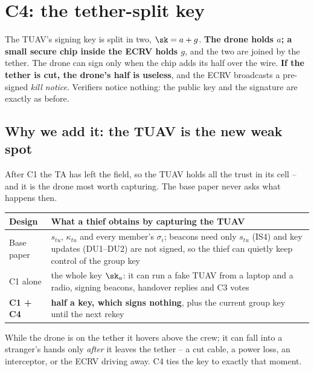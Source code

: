 \chapter{C4: the tether-split key}\label{ch:c4}
\begin{keybox}[colframe=tether,colback=tether!5]
The TUAV's signing key is split in two, $\sk=a+g$. \textbf{The drone holds $a$; a small secure chip inside the ECRV holds $g$}, and the two are joined by
the tether. The drone can sign only when the chip adds its half over the wire. \textbf{If the tether is cut, the drone's half is useless}, and the ECRV
broadcasts a pre-signed \emph{kill notice}. Verifiers notice nothing: the public key and the signature are exactly as before.
\end{keybox}

\section{Why we add it: the TUAV is the new weak spot}
After C1 the TA has left the field, so the TUAV holds all the trust in its cell -- and it is the drone most worth capturing. The base paper never asks what
happens then.
\begin{center}
\small
\begin{tabularx}{\linewidth}{@{}l X@{}}
\toprule
\textbf{Design} & \textbf{What a thief obtains by capturing the TUAV}\\
\midrule
Base paper & $s_{tu}$, $\kappa_{tu}$ and every member's $\sigma_i$; beacons need only $s_{tu}$ (IS4) and key updates (DU1--DU2) are not signed, so the thief can
quietly keep control of the group key\\
C1 alone & the whole key $\sk_a$: it can run a fake TUAV from a laptop and a radio, signing beacons, handover replies and C3 votes\\
\textbf{C1 + C4} & \textbf{half a key, which signs nothing}, plus the current group key until the next rekey\\
\bottomrule
\end{tabularx}
\end{center}
\noindent While the drone is on the tether it hovers above the crew; it can fall into a stranger's hands only \emph{after} it leaves the tether -- a cut
cable, a power loss, an interceptor, or the ECRV driving away. C4 ties the key to exactly that moment.


